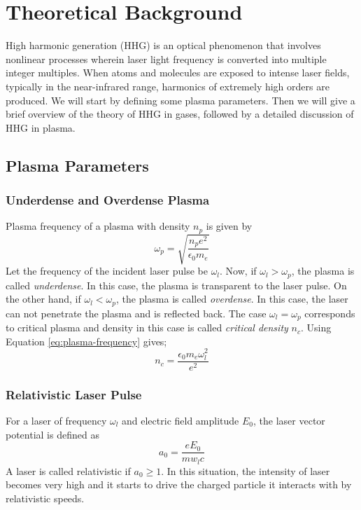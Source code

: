 \section{Theoretical Background}
High harmonic generation (HHG) is an optical phenomenon that involves nonlinear processes wherein laser light frequency is converted into multiple integer multiples. When atoms and molecules are exposed to intense laser fields, typically in the near-infrared range, harmonics of extremely high orders are produced.\cite{hhg-book} We will start by defining some plasma parameters. Then we will give a brief overview of the theory of HHG in gases, followed by a detailed discussion of HHG in plasma.

\subsection{Plasma Parameters}
\subsubsection{Underdense and Overdense Plasma}
Plasma frequency of a plasma with density $n_p$ is given by\cite{chen}
\begin{equation}
    \label{eq:plasma-frequency}
    \omega_p = \sqrt{\frac{n_p e^2}{\epsilon_0 m_e}}
\end{equation}
Let the frequency of the incident laser pulse be $\omega_l$. Now, if $\omega_l > \omega_p$, the plasma is called \textit{underdense}. In this case, the plasma is transparent to the laser pulse. On the other hand, if $\omega_l < \omega_p$, the plasma is called \textit{overdense}. In this case, the laser can not penetrate the plasma and is reflected back. The case $\omega_l = \omega_p$ corresponds to critical plasma and density in this case is called \textit{critical density} $n_c$. Using Equation \ref{eq:plasma-frequency} gives;
\begin{equation}
    \label{eq:critical-density}
    n_c = \frac{\epsilon_0 m_e \omega_l^2}{e^2}
\end{equation}

\subsubsection{Relativistic Laser Pulse}
For a laser of frequency $\omega_l$ and electric field amplitude $E_0$, the laser vector potential is defined as
\begin{equation}
    \label{eq:vector_potential}
    a_0 = \frac{eE_0}{m w_l c}
\end{equation}
A laser is called relativistic if $a_0 \ge 1$. In this situation, the intensity of laser becomes very high and it starts to drive the charged particle it interacts with by relativistic speeds.

